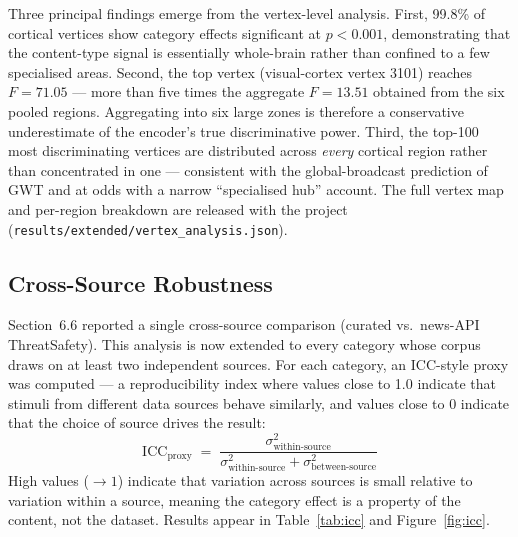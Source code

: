 \documentclass[11pt,letterpaper]{article}
\numberwithin{equation}{section}
\begin{document}
Three principal findings emerge from the vertex-level analysis. First, 99.8\% of cortical vertices show category effects significant at $p < 0.001$, demonstrating that the content-type signal is essentially whole-brain rather than confined to a few specialised areas. Second, the top vertex (visual-cortex vertex 3101) reaches $F = 71.05$ --- more than five times the aggregate $F = 13.51$ obtained from the six pooled regions. Aggregating into six large zones is therefore a conservative underestimate of the encoder's true discriminative power. Third, the top-100 most discriminating vertices are distributed across \textit{every} cortical region rather than concentrated in one --- consistent with the global-broadcast prediction of GWT and at odds with a narrow ``specialised hub'' account. The full vertex map and per-region breakdown are released with the project (\texttt{results/extended/vertex\_analysis.json}).

\subsection{Cross-Source Robustness}\label{sec:robust}

Section~6.6 reported a single cross-source comparison (curated vs.\ news-API ThreatSafety). This analysis is now extended to every category whose corpus draws on at least two independent sources. For each category, an ICC-style proxy was computed --- a reproducibility index where values close to 1.0 indicate that stimuli from different data sources behave similarly, and values close to 0 indicate that the choice of source drives the result:
\begin{equation}\label{eq:icc}
\text{ICC}_{\text{proxy}} \;=\; \frac{\sigma^2_{\text{within-source}}}{\sigma^2_{\text{within-source}} + \sigma^2_{\text{between-source}}}
\end{equation}
High values (${\to}1$) indicate that variation across sources is small relative to variation within a source, meaning the category effect is a property of the content, not the dataset. Results appear in Table~\ref{tab:icc} and Figure~\ref{fig:icc}.
\end{document}
